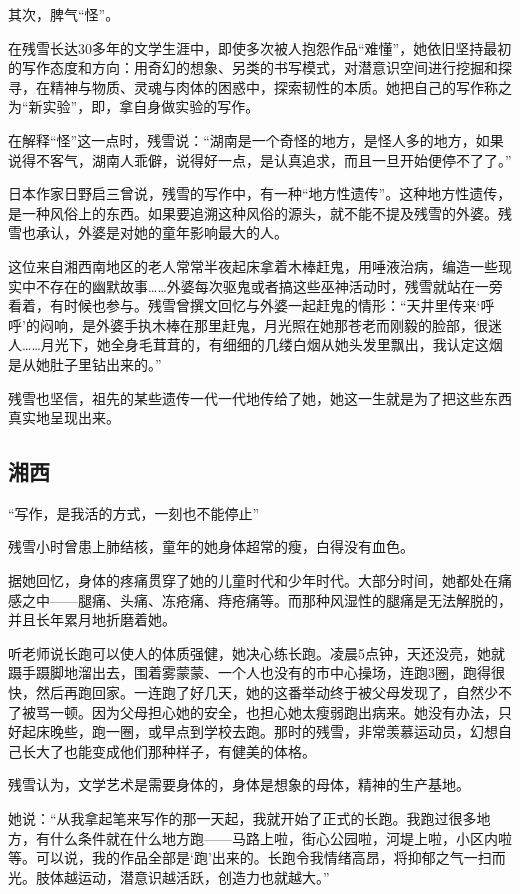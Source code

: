 \documentclass[fontset=fandol,12pt,a5paper]{ctexbook}
\begin{document}
其次，脾气“怪”。

在残雪长达30多年的文学生涯中，即使多次被人抱怨作品“难懂”，她依旧坚持最初的写作态度和方向：用奇幻的想象、另类的书写模式，对潜意识空间进行挖掘和探寻，在精神与物质、灵魂与肉体的困惑中，探索韧性的本质。她把自己的写作称之为“新实验”，即，拿自身做实验的写作。

在解释“怪”这一点时，残雪说：“湖南是一个奇怪的地方，是怪人多的地方，如果说得不客气，湖南人乖僻，说得好一点，是认真追求，而且一旦开始便停不了了。”

日本作家日野启三曾说，残雪的写作中，有一种“地方性遗传”。这种地方性遗传，是一种风俗上的东西。如果要追溯这种风俗的源头，就不能不提及残雪的外婆。残雪也承认，外婆是对她的童年影响最大的人。

这位来自湘西南地区的老人常常半夜起床拿着木棒赶鬼，用唾液治病，编造一些现实中不存在的幽默故事……外婆每次驱鬼或者搞这些巫神活动时，残雪就站在一旁看着，有时候也参与。残雪曾撰文回忆与外婆一起赶鬼的情形：“天井里传来‘呼呼’的闷响，是外婆手执木棒在那里赶鬼，月光照在她那苍老而刚毅的脸部，很迷人……月光下，她全身毛茸茸的，有细细的几缕白烟从她头发里飘出，我认定这烟是从她肚子里钻出来的。”

残雪也坚信，祖先的某些遗传一代一代地传给了她，她这一生就是为了把这些东西真实地呈现出来。

\subsection{湘西}
“写作，是我活的方式，一刻也不能停止”

残雪小时曾患上肺结核，童年的她身体超常的瘦，白得没有血色。

据她回忆，身体的疼痛贯穿了她的儿童时代和少年时代。大部分时间，她都处在痛感之中——腿痛、头痛、冻疮痛、痔疮痛等。而那种风湿性的腿痛是无法解脱的，并且长年累月地折磨着她。

听老师说长跑可以使人的体质强健，她决心练长跑。凌晨5点钟，天还没亮，她就蹑手蹑脚地溜出去，围着雾蒙蒙、一个人也没有的市中心操场，连跑3圈，跑得很快，然后再跑回家。一连跑了好几天，她的这番举动终于被父母发现了，自然少不了被骂一顿。因为父母担心她的安全，也担心她太瘦弱跑出病来。她没有办法，只好起床晚些，跑一圈，或早点到学校去跑。那时的残雪，非常羡慕运动员，幻想自己长大了也能变成他们那种样子，有健美的体格。

残雪认为，文学艺术是需要身体的，身体是想象的母体，精神的生产基地。

她说：“从我拿起笔来写作的那一天起，我就开始了正式的长跑。我跑过很多地方，有什么条件就在什么地方跑——马路上啦，街心公园啦，河堤上啦，小区内啦等。可以说，我的作品全部是‘跑’出来的。长跑令我情绪高昂，将抑郁之气一扫而光。肢体越运动，潜意识越活跃，创造力也就越大。”
\end{document}
